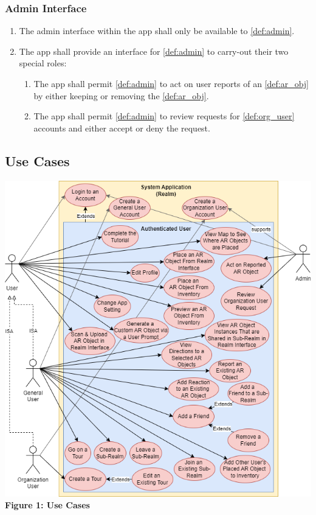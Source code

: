 \documentclass{article}
\begin{document}
\subsubsection{Admin Interface}
\label{ssub:admin_interface}

\begin{enumerate}[align=left, label=\textbf{AI-FR\arabic*:}]
    \item The admin interface within the app shall only be available to \ref{def:admin}.
    \item The app shall provide an interface for \ref{def:admin} to carry-out their two special roles:
    \begin{enumerate}[align=left, label=\textbf{AI-FR2.\arabic*:}]
        \item The app shall permit \ref{def:admin} to act on user reports of an \ref{def:ar_obj} by either keeping or removing the \ref{def:ar_obj}.
        \item The app shall permit \ref{def:admin} to review requests for \ref{def:org_user} accounts and either accept or deny the request.
    \end{enumerate}
\end{enumerate}

\subsection{Use Cases}
\label{sub:use_cases}

\begin{center}
    \includegraphics[scale=0.5]{use_cases.png}\\ 
    \textbf{Figure 1: Use Cases}
\end{center}
\end{document}
